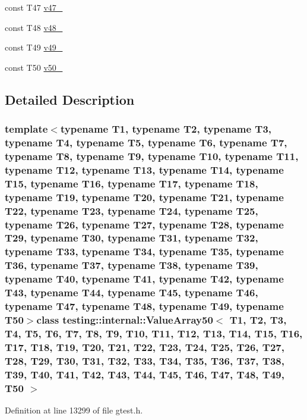 \begin{DoxyCompactItemize}
\item 
const \-T47 \hyperlink{classtesting_1_1internal_1_1ValueArray50_afcdfdbd5fa48a3dc7175a1e75f795257}{v47\-\_\-}
\item 
const \-T48 \hyperlink{classtesting_1_1internal_1_1ValueArray50_a11fce9e45df4b39f8c460647e05fd3e4}{v48\-\_\-}
\item 
const \-T49 \hyperlink{classtesting_1_1internal_1_1ValueArray50_a83d91638a28899e0007ca48a3158b526}{v49\-\_\-}
\item 
const \-T50 \hyperlink{classtesting_1_1internal_1_1ValueArray50_a6acd926e6981e1cd74f88574e2c1cb7e}{v50\-\_\-}
\end{DoxyCompactItemize}


\subsection{\-Detailed \-Description}
\subsubsection*{template$<$typename T1, typename T2, typename T3, typename T4, typename T5, typename T6, typename T7, typename T8, typename T9, typename T10, typename T11, typename T12, typename T13, typename T14, typename T15, typename T16, typename T17, typename T18, typename T19, typename T20, typename T21, typename T22, typename T23, typename T24, typename T25, typename T26, typename T27, typename T28, typename T29, typename T30, typename T31, typename T32, typename T33, typename T34, typename T35, typename T36, typename T37, typename T38, typename T39, typename T40, typename T41, typename T42, typename T43, typename T44, typename T45, typename T46, typename T47, typename T48, typename T49, typename T50$>$class testing\-::internal\-::\-Value\-Array50$<$ T1, T2, T3, T4, T5, T6, T7, T8, T9, T10, T11, T12, T13, T14, T15, T16, T17, T18, T19, T20, T21, T22, T23, T24, T25, T26, T27, T28, T29, T30, T31, T32, T33, T34, T35, T36, T37, T38, T39, T40, T41, T42, T43, T44, T45, T46, T47, T48, T49, T50 $>$}



\-Definition at line 13299 of file gtest.\-h.



